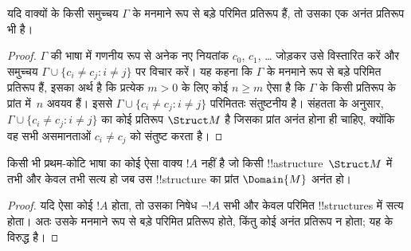 \documentclass[../../../include/open-logic-section]{subfiles}
\begin{document}

\begin{thm}
 यदि वाक्यों के किसी समुच्चय $\Gamma$ के मनमाने रूप से
बड़े परिमित प्रतिरूप हैं, तो उसका एक अनंत प्रतिरूप भी है।
\end{thm}

\begin{proof}
$\Gamma$ की भाषा में गणनीय रूप से अनेक नए नियतांक $c_0$, $c_1$, \dots
जोड़कर उसे विस्तारित करें और समुच्चय $\Gamma \cup \{c_i \neq c_j :
i \neq j\}$ पर विचार करें। यह कहना कि $\Gamma$ के मनमाने रूप से बड़े परिमित
प्रतिरूप हैं, इसका अर्थ है कि प्रत्येक $m >0$ के लिए कोई $n\ge m$ ऐसा है कि
$\Gamma$ के किसी प्रतिरूप के प्रांत में~$n$ अवयव हैं। इससे $\Gamma \cup \{c_i \neq
c_j : i \neq j\}$ परिमिततः संतुष्टनीय है। संहतता के अनुसार, $\Gamma
\cup \{c_i \neq c_j : i \neq j\}$ का कोई प्रतिरूप $\Struct M$ है जिसका प्रांत
अनंत होना ही चाहिए, क्योंकि वह सभी असमानताओं $c_i \neq c_j$ को संतुष्ट करता
है।
\end{proof}

\begin{prop}
किसी भी प्रथम-कोटि भाषा का कोई ऐसा वाक्य $!A$ नहीं है जो किसी
!!a{structure}~$\Struct M$ में तभी और केवल तभी सत्य हो जब उस !!{structure}
का प्रांत $\Domain{M}$ अनंत हो।
\end{prop}

\begin{proof}
यदि ऐसा कोई $!A$ होता, तो उसका निषेध $\lnot !A$ सभी और केवल परिमित
!!{structure}s में सत्य होता। अतः उसके मनमाने रूप से बड़े परिमित प्रतिरूप
होते, किंतु कोई अनंत प्रतिरूप न होता; यह  के विरुद्ध है।
\end{proof}
\end{document}

